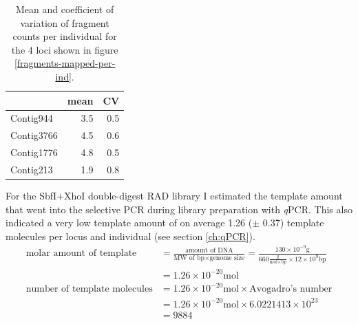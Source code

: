 \documentclass[a4paper,12pt,times,print,index,custombib,custommargin]{PhDThesisPSnPDF}\usepackage[]{graphicx}\usepackage[]{color}
\begin{document}
\begin{table}[ht]
\centering
\caption{Mean and coefficient of variation of fragment counts per individual for the 4 loci shown in figure \ref{fragments-mapped-per-ind}.} 
\label{mean_sd_fragNum_per_locus}
\begin{tabular}{lrr}
  \toprule
 & mean & CV \\ 
  \midrule
Contig944 & 3.5 & 0.5 \\ 
  Contig3766 & 4.5 & 0.6 \\ 
  Contig1776 & 4.8 & 0.5 \\ 
  Contig213 & 1.9 & 0.8 \\ 
   \bottomrule
\end{tabular}
\end{table}

%
For the SbfI$+$XhoI double-digest RAD library I estimated the template amount that went into the selective PCR during library preparation with \textit{q}PCR. This also indicated a very low template amount of on average 1.26 ($\pm$ 0.37) template molecules per locus and individual (see section \ref{ch:qPCR}).
%
\footnotesize
\begin{align}
\text{molar amount of template} &= \frac{\text{amount of DNA}}{\text{MW of bp} \times \text{genome size}} 
= \frac{130 \times 10^{-9}\text{g}}{660 \frac{\text{g}}{\text{mol} \times \text{bp}} \times 12 \times 10^{9} \text{bp}} \label{eq:genome_copies} \\
&= 1.26 \times 10^{-20} \text{mol} \nonumber \\[5pt]
\text{number of template molecules} &= 1.26 \times 10^{-20} \text{mol} \times \text{Avogadro's number} \nonumber \\
&= 1.26 \times 10^{-20} \text{mol} \times 6.0221413 \times 10^{23} \nonumber \\
&= 9884 \nonumber
\end{align}
\normalsize
\end{document}
